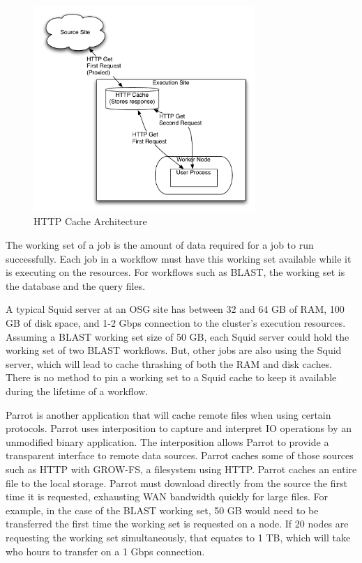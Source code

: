 \begin{figure}[ht]
	\centering
	\includegraphics[width=0.75\textwidth]{images/HTTPCache.pdf}
	\caption{HTTP Cache Architecture}
	\label{fig:httpcachearchitecture}
\end{figure}

The working set of a job is the amount of data required for a job to run successfully.  Each job in a workflow must have this working set available while it is executing on the resources.  For workflows such as BLAST, the working set is the database and the query files.  

A typical Squid server at an OSG site has between 32 and 64 GB of RAM, 100 GB of disk space, and 1-2 Gbps connection to the cluster's execution resources.  Assuming a BLAST working set size of 50 GB, each Squid server could hold the working set of two BLAST workflows.  But, other jobs are also using the Squid server, which will lead to cache thrashing of both the RAM and disk caches.  There is no method to pin a working set to a Squid cache to keep it available during the lifetime of a workflow.


Parrot \cite{thain2005parrot} is another application that will cache remote files when using certain protocols.  Parrot uses interposition \cite{thain2001multiple} to capture and interpret IO operations by an unmodified binary application.  The interposition allows Parrot to provide a transparent interface to remote data sources.  Parrot caches some of those sources such as HTTP with GROW-FS, a filesystem using HTTP.  Parrot caches an entire file to the local storage.  Parrot must download directly from the source the first time it is requested, exhausting WAN bandwidth quickly for large files.  For example, in the case of the BLAST working set, 50 GB would need to be transferred the first time the working set is requested on a node.  If 20 nodes are requesting the working set simultaneously, that equates to 1 TB, which will take who hours to transfer on a 1 Gbps connection.


